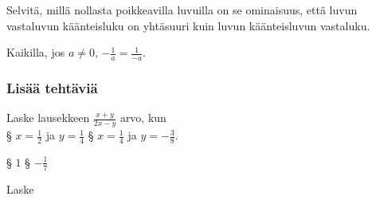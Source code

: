 \begin{tehtavasivu}
\begin{tehtava}
Selvitä, millä nollasta poikkeavilla luvuilla on se ominaisuus, että luvun vastaluvun käänteisluku on yhtäsuuri kuin luvun käänteisluvun vastaluku.
\begin{vastaus}
Kaikilla, jos $a \neq 0$, $-\frac{1}{a} = \frac{1}{-a}$.
\end{vastaus}
\end{tehtava}

\subsubsection*{Lisää tehtäviä}

\begin{tehtava}
Laske lausekkeen $\frac{x+y}{2x-y}$ arvo, kun \\
§ $x=\frac{1}{2}$ ja $y= \frac{1}{4}$ 
§ $x=\frac{1}{4}$ ja $y= -\frac{3}{8}$.
\begin{vastaus}
§ $1$ 
§ $-\frac{1}{7}$
\end{vastaus}
\end{tehtava}
 
        \begin{tehtava} Laske %
            \begin{vastaus}
            \end{vastaus}
        \end{tehtava}
        
        \begin{tehtava}
            \begin{vastaus}		
            \end{vastaus}
        \end{tehtava}
        
        \begin{tehtava}
            \begin{vastaus}
            \end{vastaus}
        \end{tehtava}
        

\end{tehtavasivu}
